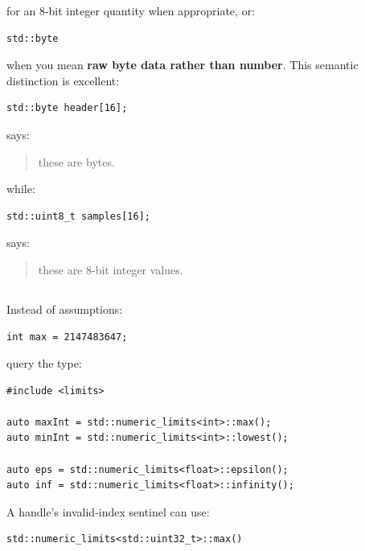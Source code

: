 for an 8-bit integer quantity when appropriate, or:

\begin{verbatim}
std::byte
\end{verbatim}

when you mean \textbf{raw byte data rather than number}. This semantic distinction is excellent:

\begin{verbatim}
std::byte header[16];
\end{verbatim}

says:

\begin{quote}
these are bytes.
\end{quote}

while:

\begin{verbatim}
std::uint8_t samples[16];
\end{verbatim}

says:

\begin{quote}
these are 8-bit integer values.
\end{quote}

\subsection{\texorpdfstring{}{numeric\_limits}}\label{05-engine-i-ch002-numeric_limits}

\hypertarget{05-engine-i-ch002-numeric_limits}{}

Instead of assumptions:

\begin{verbatim}
int max = 2147483647;
\end{verbatim}

query the type:

\begin{verbatim}
#include <limits>

auto maxInt = std::numeric_limits<int>::max();
auto minInt = std::numeric_limits<int>::lowest();

auto eps = std::numeric_limits<float>::epsilon();
auto inf = std::numeric_limits<float>::infinity();
\end{verbatim}

A handle's invalid-index sentinel can use:

\begin{verbatim}
std::numeric_limits<std::uint32_t>::max()
\end{verbatim}


